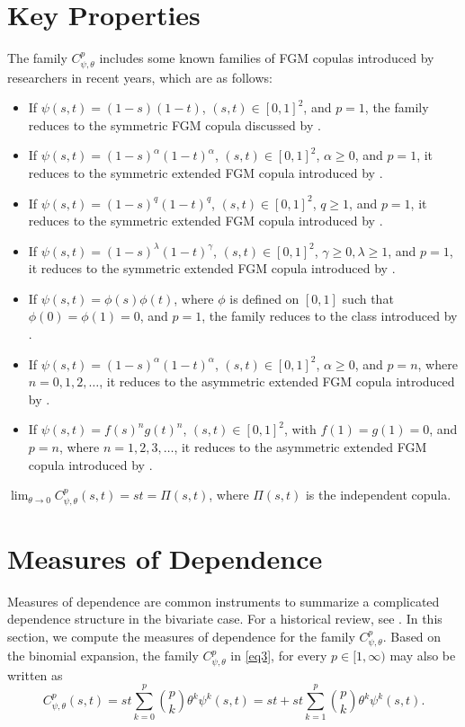 \documentclass[twoside]{article}
\numberwithin{equation}{section}
\begin{document}
\section{Key Properties}
\begin{pro}\label{pr1}
The family $C_{\psi,\theta}^p$ includes some known families of FGM copulas introduced by researchers in recent years, which are as follows:
\begin{itemize}
\item[i.] If $\psi(s,t) = (1-s)(1-t)$, $(s,t) \in [0,1]^2$, and $p=1$, the family reduces to the symmetric FGM copula discussed by \cite{Farlie1960, Gumbel1960, Morgenstern1956}.
\item[ii.] If $\psi(s,t) = (1-s)^\alpha (1-t)^\alpha$, $(s,t) \in [0,1]^2$, $\alpha \ge 0$, and $p=1$, it reduces to the symmetric extended FGM copula introduced by \cite{HuangKotz1999}.
\item[iii.] If $\psi(s,t) = (1-s)^q (1-t)^q$, $(s,t) \in [0,1]^2$, $q \ge 1$, and $p=1$, it reduces to the symmetric extended FGM copula introduced by \cite{LaiXie2000}.
\item[iv.] If $\psi(s,t) = (1-s)^\lambda (1-t)^\gamma$, $(s,t) \in [0,1]^2$, $\gamma \ge 0, \lambda \ge 1$, and $p=1$, it reduces to the symmetric extended FGM copula introduced by \cite{BairamovKotz2002}.
\item[v.] If $\psi(s,t) = \phi(s)\phi(t)$, where $\phi$ is defined on $[0,1]$ such that $\phi(0)=\phi(1)=0$, and $p=1$, the family reduces to the class introduced by \cite{Rodriguez2004}.
\item[vi.] If $\psi(s,t) = (1-s)^\alpha (1-t)^\alpha$, $(s,t) \in [0,1]^2$, $\alpha \ge 0$, and $p=n$, where $n=0,1,2,\dots$, it reduces to the asymmetric extended FGM copula introduced by \cite{Bekrizadeh2012}.
\item[vii.] If $\psi(s,t) = f(s)^n g(t)^n$, $(s,t) \in [0,1]^2$, with $f(1)=g(1)=0$, and $p=n$, where $n=1,2,3,\dots$, it reduces to the asymmetric extended FGM copula introduced by \cite{Pathak2016}.
\end{itemize}
\end{pro}

\begin{pro}\label{pr2}
$\lim_{\theta \to 0} C_{\psi,\theta}^p(s,t) = st = \Pi(s,t)$, where $\Pi(s,t)$ is the independent copula.
\end{pro}

\section{Measures of Dependence}
Measures of dependence are common instruments to summarize a complicated dependence structure in the bivariate case. For a historical review, see \cite{Joe1997, Nelsen2006}. In this section, we compute the measures of dependence for the family $C_{\psi,\theta}^p$. Based on the binomial expansion, the family $C_{\psi,\theta}^p$ in \eqref{eq3}, for every $p \in [1, \infty)$ may also be written as
\begin{equation}\label{eq4}
C_{\psi,\theta}^p(s,t) = st \sum_{k=0}^{p} \binom{p}{k} \theta^k \psi^k(s,t) = st + st \sum_{k=1}^{p} \binom{p}{k} \theta^k \psi^k(s,t).
\end{equation}
\end{document}

